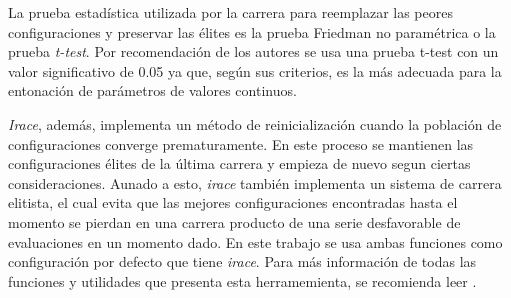 

La prueba estadística utilizada por la carrera para reemplazar las peores configuraciones y preservar las élites es la prueba Friedman no paramétrica o la prueba \emph{t-test}. Por recomendación de los autores se usa una prueba t-test con un valor significativo de 0.05 ya que, según sus criterios, es la más adecuada para la entonación de parámetros de valores continuos.

\emph{Irace}, además, implementa un método de reinicialización cuando la población de configuraciones converge prematuramente. En este proceso se mantienen las configuraciones élites de la última carrera y empieza de nuevo segun ciertas consideraciones. Aunado a esto, \emph{irace} también implementa un sistema de carrera elitista, el cual evita que las mejores configuraciones encontradas hasta el momento se pierdan en una carrera producto de una serie desfavorable de evaluaciones en un momento dado. En este trabajo se usa ambas funciones como configuración por defecto que tiene \emph{irace}. Para más información de todas las funciones y utilidades que presenta esta herramemienta, se recomienda leer \cite{lopez2016irace}.
